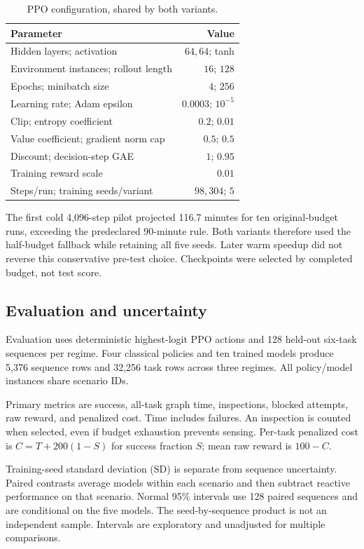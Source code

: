\documentclass[journal]{IEEEtai}
\begin{document}
\begin{table}[t]
\caption{PPO configuration, shared by both variants.}
\label{tab:config}\centering\small
\begin{tabular}{lr}\hline
Parameter & Value \\ \hline
Hidden layers; activation & $64,64$; tanh \\
Environment instances; rollout length & $16$; $128$ \\
Epochs; minibatch size & $4$; $256$ \\
Learning rate; Adam epsilon & $0.0003$; $10^{-5}$ \\
Clip; entropy coefficient & $0.2$; $0.01$ \\
Value coefficient; gradient norm cap & $0.5$; $0.5$ \\
Discount; decision-step GAE & $1$; $0.95$ \\
Training reward scale & $0.01$ \\
Steps/run; training seeds/variant & $98{,}304$; $5$ \\ \hline
\end{tabular}
\end{table}

The first cold 4,096-step pilot projected 116.7 minutes for ten original-budget runs, exceeding the predeclared 90-minute rule. Both variants therefore used the half-budget fallback while retaining all five seeds. Later warm speedup did not reverse this conservative pre-test choice. Checkpoints were selected by completed budget, not test score.



\subsection{Evaluation and uncertainty}
Evaluation uses deterministic highest-logit PPO actions and 128 held-out six-task sequences per regime. Four classical policies and ten trained models produce 5,376 sequence rows and 32,256 task rows across three regimes. All policy/model instances share scenario IDs.

Primary metrics are success, all-task graph time, inspections, blocked attempts, raw reward, and penalized cost. Time includes failures. An inspection is counted when selected, even if budget exhaustion prevents sensing. Per-task penalized cost is $C=T+200(1-S)$ for success fraction $S$; mean raw reward is $100-C$.

Training-seed standard deviation (SD) is separate from sequence uncertainty. Paired contrasts average models within each scenario and then subtract reactive performance on that scenario. Normal 95\% intervals use 128 paired sequences and are conditional on the five models. The seed-by-sequence product is not an independent sample. Intervals are exploratory and unadjusted for multiple comparisons.
\end{document}
